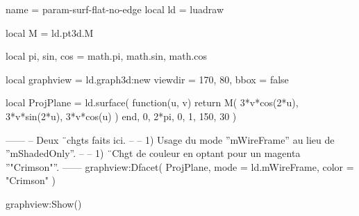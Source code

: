\documentclass[border = 3pt]{standalone}
\begin{document}
\begin{luadraw*}{name = param-surf-flat-no-edge}
local ld = luadraw

local M = ld.pt3d.M

local pi, sin, cos = math.pi, math.sin, math.cos

local graphview = ld.graph3d:new{
  viewdir = {170, 80},
  bbox    = false
}

local ProjPlane = ld.surface(
  function(u, v)
    return M(
      3*v*cos(2*u),
      3*v*sin(2*u),
      3*v*cos(u)
    )
  end,
  0, 2*pi, 0, 1,
  {150, 30}
)

------
-- Deux ¨chgts faits ici.
--
--     1) Usage du mode ''mWireFrame'' au lieu de ''mShadedOnly''.
--
--     1) ¨Chgt de couleur en optant pour un magenta ''"Crimson"''.
------
graphview:Dfacet(
  ProjPlane,
  {
    mode  = ld.mWireFrame,
    color = "Crimson"
  }
)

graphview:Show()
\end{luadraw*}
\end{document}
